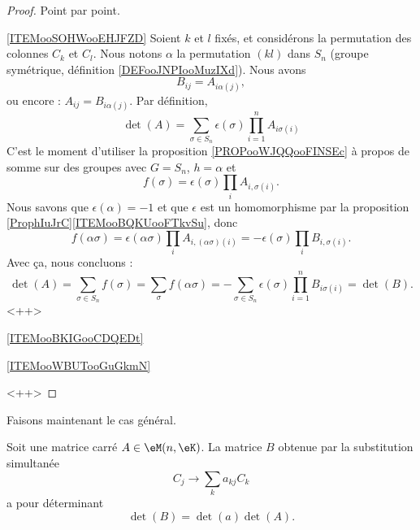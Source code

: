 \begin{proof}
    Point par point.
    \begin{subproof}
        \item[\ref{ITEMooSOHWooEHJFZD}]
            Soient \( k\) et \( l\) fixés, et considérons la permutation des colonnes \( C_k\) et \( C_l\). Nous notons \( \alpha\) la permutation \( (kl)\) dans \( S_n\) (groupe symétrique, définition \ref{DEFooJNPIooMuzIXd}). Nous avons
            \begin{equation}
                B_{ij}=A_{i \alpha(j)},
            \end{equation}
            ou encore : \( A_{ij}=B_{i\alpha(j)}\). Par définition,
            \begin{equation}
                \det(A)=\sum_{\sigma\in S_{n}}\epsilon(\sigma)\prod_{i=1}^nA_{i\sigma(i)}
            \end{equation}
            C'est le moment d'utiliser la proposition \ref{PROPooWJQQooFINSEc} à propos de somme sur des groupes avec \( G=S_n\), \( h=\alpha\) et 
            \begin{equation}
                f(\sigma)=\epsilon(\sigma)\prod_iA_{i,\sigma(i)}.
            \end{equation}
            Nous savons que \( \epsilon(\alpha)=-1\) et que \( \epsilon\) est un homomorphisme par la proposition \ref{ProphIuJrC}\ref{ITEMooBQKUooFTkvSu}, donc
            \begin{equation}
                f(\alpha \sigma)=\epsilon(\alpha\sigma)\prod_iA_{i,(\alpha\sigma)(i)}=-\epsilon(\sigma)\prod_iB_{i,\sigma(i)}.
            \end{equation}
            Avec ça, nous concluons :
            \begin{equation}
                \det(A)=\sum_{\sigma\in S_n}f(\sigma)=\sum_{\sigma}f(\alpha \sigma)=-\sum_{\sigma\in S_n}\epsilon(\sigma)\prod_{i=1}^nB_{i\sigma(i)}=\det(B).
            \end{equation}
            <++>

        \item[\ref{ITEMooBKIGooCDQEDt}]
        \item[\ref{ITEMooWBUTooGuGkmN}]
    \end{subproof}
    <++>
\end{proof}

Faisons maintenant le cas général.

\begin{proposition}
    Soit une matrice carré \( A\in \eM(n,\eK)\). La matrice \( B\) obtenue par la substitution simultanée
    \begin{equation}
        C_j\to \sum_ka_{kj}C_k
    \end{equation}
    a pour déterminant
    \begin{equation}
        \det(B)=\det(a)\det(A).
    \end{equation}
\end{proposition}

